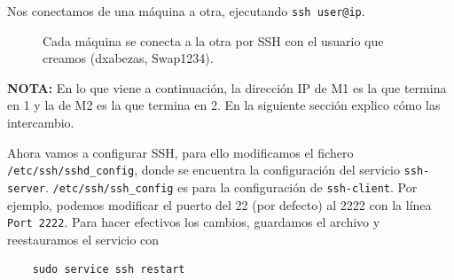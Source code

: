 \documentclass{article}
\begin{document}
Nos conectamos de una máquina a otra, ejecutando \texttt{ssh user@ip}.
\begin{figure}[H]
\centering
{}
\caption{Cada máquina se conecta a la otra por SSH con el usuario que creamos (dxabezas, Swap1234).}
\label{fig:ssh}
\end{figure}

\textbf{NOTA:} En lo que viene a continuación, la dirección IP de M1 es la que termina en 1 y la de M2 es la que termina en 2.
En la siguiente sección
explico cómo las intercambio.

Ahora vamos a configurar SSH, para ello modificamos el fichero \texttt{/etc/ssh/sshd\_config}, donde se encuentra la configuración
del servicio \texttt{ssh-server}. \texttt{/etc/ssh/ssh\_config} es para la configuración de \texttt{ssh-client}.
Por ejemplo, podemos modificar el puerto del 22 (por defecto) al 2222 con la línea \texttt{Port 2222}. Para hacer efectivos los cambios,
guardamos el archivo y reestauramos el servicio con

\begin{verbatim}
	sudo service ssh restart
\end{verbatim}
\end{document}
